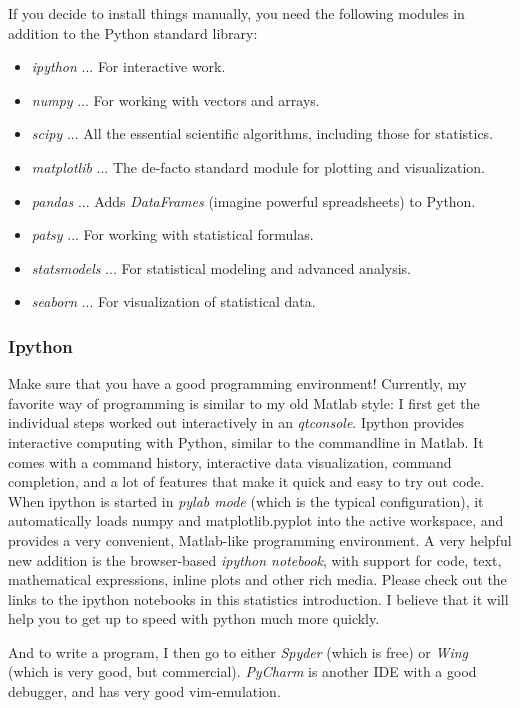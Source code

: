 If you decide to install things manually, you need the following modules in addition to the Python standard library:

\begin{itemize}
  \item \emph{ipython} ... For interactive work.
  \item \emph{numpy} ... For working with vectors and arrays.
  \item \emph{scipy} ... All the essential scientific algorithms, including those for statistics.
  \item \emph{matplotlib} ... The de-facto standard module for plotting and visualization.
  \item \emph{pandas} ... Adds \emph{DataFrames} (imagine powerful spreadsheets) to Python.
  \item \emph{patsy} ... For working with statistical formulas.
  \item \emph{statsmodels} ... For statistical modeling and advanced analysis.
  \item \emph{seaborn} ... For visualization of statistical data.
\end{itemize}

\subsubsection{Ipython}


Make sure that you have a good programming environment! Currently, my favorite way of programming is similar to my old Matlab style: I first get the individual steps worked out interactively in an \cite{ipython} \emph{qtconsole}. Ipython  provides interactive computing with Python, similar to the commandline in Matlab. It comes with a command history, interactive data visualization, command completion, and a lot of features that make it quick and easy to try out code.
When ipython is started in \emph{pylab mode} (which is the typical configuration), it automatically loads numpy and matplotlib.pyplot into the
active workspace, and provides a very convenient, Matlab-like programming environment. A very helpful new addition is the browser-based \emph{ipython
notebook}, with support for code, text, mathematical expressions, inline plots and other rich media. Please check out the links to the ipython
notebooks in this statistics introduction. I believe that it will  help you to get up to speed with python much more quickly.

And to write a program, I then go to either \emph{Spyder} (which is free) or \emph{Wing} (which is very good, but commercial). \emph{PyCharm} is another IDE with a good debugger, and has very good vim-emulation.

